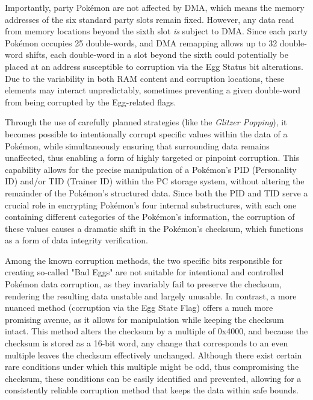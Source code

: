 \documentclass[a4paper]{usiinfbachelorproject}
\begin{document}
Importantly, party Pokémon are not affected by DMA, which means the memory addresses of the six standard party slots remain fixed. However, any data read from memory locations beyond the sixth slot \textit{is} subject to DMA. Since each party Pokémon occupies 25 double-words, and DMA remapping allows up to 32 double-word shifts, each double-word in a slot beyond the sixth could potentially be placed at an address susceptible to corruption via the Egg Status bit alterations. Due to the variability in both RAM content and corruption locations, these elements may interact unpredictably, sometimes preventing a given double-word from being corrupted by the Egg-related flags.

Through the use of carefully planned strategies (like the \textit{Glitzer Popping}), it becomes possible to intentionally corrupt specific values within the data of a Pokémon, while simultaneously ensuring that surrounding data remains unaffected, thus enabling a form of highly targeted or pinpoint corruption. This capability allows for the precise manipulation of a Pokémon's PID (Personality ID) and/or TID (Trainer ID) within the PC storage system, without altering the remainder of the Pokémon’s structured data. Since both the PID and TID serve a crucial role in encrypting Pokémon’s four internal substructures, with each one containing different categories of the Pokémon’s information, the corruption of these values causes a dramatic shift in the Pokémon’s checksum, which functions as a form of data integrity verification.

Among the known corruption methods, the two specific bits responsible for creating so-called "Bad Eggs" are not suitable for intentional and controlled Pokémon data corruption, as they invariably fail to preserve the checksum, rendering the resulting data unstable and largely unusable. In contrast, a more nuanced method (corruption via the Egg State Flag) offers a much more promising avenue, as it allows for manipulation while keeping the checksum intact. This method alters the checksum by a multiple of 0x4000, and because the checksum is stored as a 16-bit word, any change that corresponds to an even multiple leaves the checksum effectively unchanged. Although there exist certain rare conditions under which this multiple might be odd, thus compromising the checksum, these conditions can be easily identified and prevented, allowing for a consistently reliable corruption method that keeps the data within safe bounds.
\end{document}
